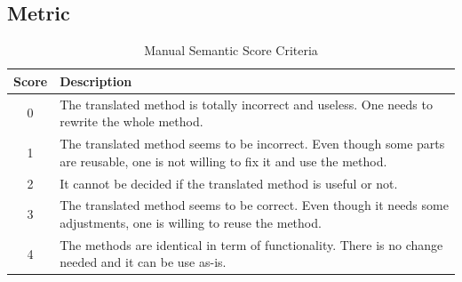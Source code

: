 \subsection{Metric} 
%
\begin{table}
\caption{Manual Semantic Score Criteria}
\begin{tabular}{|c|p{6.5cm}|}
\hline
Score & Description \\
\hline
0 & The translated method is totally incorrect and useless. One needs to rewrite the whole method. \\
\hline
1 & The translated method seems to be incorrect. Even though some parts are reusable, one is not willing to fix it and use the method. \\
\hline
2 &  It cannot be decided if the translated method is useful or not. \\
\hline
3 & The translated method seems to be correct. Even though it needs some adjustments, one is willing to reuse the method. \\
\hline
4 & The methods are identical in term of functionality. There is no change needed and it can be use as-is. \\
\hline
\end{tabular}
\label{table:criteria}
\end{table}

